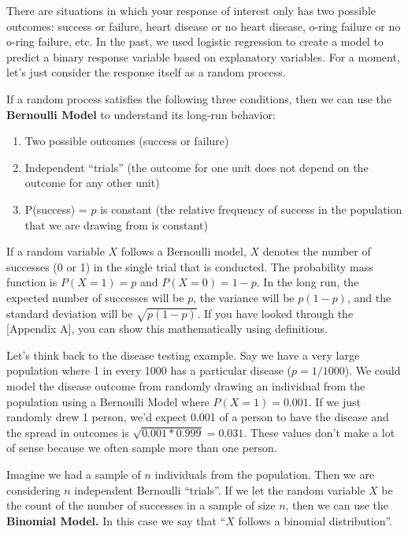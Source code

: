 \documentclass[
]{book}
\providecommand{\tightlist}{%
  \setlength{\itemsep}{0pt}\setlength{\parskip}{0pt}}
\begin{document}
There are situations in which your response of interest only has two possible outcomes: success or failure, heart disease or no heart disease, o-ring failure or no o-ring failure, etc. In the past, we used logistic regression to create a model to predict a binary response variable based on explanatory variables. For a moment, let's just consider the response itself as a random process.

If a random process satisfies the following three conditions, then we can use the \textbf{Bernoulli Model} to understand its long-run behavior:

\begin{enumerate}
\def\labelenumi{\arabic{enumi}.}
\tightlist
\item
  Two possible outcomes (success or failure)
\item
  Independent ``trials'' (the outcome for one unit does not depend on the outcome for any other unit)
\item
  P(success) = \(p\) is constant (the relative frequency of success in the population that we are drawing from is constant)
\end{enumerate}

If a random variable \(X\) follows a Bernoulli model, \(X\) denotes the number of successes (0 or 1) in the single trial that is conducted. The probability mass function is \(P(X = 1) = p\) and \(P(X = 0) = 1-p\). In the long run, the expected number of successes will be \(p\), the variance will be \(p(1-p)\), and the standard deviation will be \(\sqrt{p(1-p)}\). If you have looked through the {[}Appendix A{]}, you can show this mathematically using definitions.

Let's think back to the disease testing example. Say we have a very large population where 1 in every 1000 has a particular disease (\(p = 1/1000\)). We could model the disease outcome from randomly drawing an individual from the population using a Bernoulli Model where \(P(X = 1) = 0.001\). If we just randomly drew 1 person, we'd expect 0.001 of a person to have the disease and the spread in outcomes is \(\sqrt{0.001*0.999} = 0.031\). These values don't make a lot of sense because we often sample more than one person.

Imagine we had a sample of \(n\) individuals from the population. Then we are considering \(n\) independent Bernoulli ``trials''. If we let the random variable \(X\) be the count of the number of successes in a sample of size \(n\), then we can use the \textbf{Binomial Model.} In this case we say that ``\(X\) follows a binomial distribution''.
\end{document}
